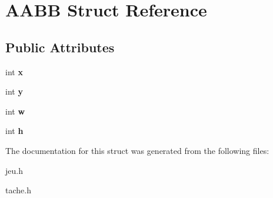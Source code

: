 \hypertarget{structAABB}{}\section{A\+A\+BB Struct Reference}
\label{structAABB}
\subsection*{Public Attributes}
\begin{DoxyCompactItemize}
\item 
\mbox{\label{structAABB_a5b8f8f642a267ecffb4f4d80a695cbd3}} 
int {\bfseries x}
\item 
\mbox{\label{structAABB_a5683a773fbf63be503f1cb04cccf49a5}} 
int {\bfseries y}
\item 
\mbox{\label{structAABB_ab9c7baba7d4a1d002b9d35372401ce43}} 
int {\bfseries w}
\item 
\mbox{\label{structAABB_a390af6ca9f742727209d27b46d840f91}} 
int {\bfseries h}
\end{DoxyCompactItemize}


The documentation for this struct was generated from the following files\+:\begin{DoxyCompactItemize}
\item 
jeu.\+h\item 
tache.\+h\end{DoxyCompactItemize}
